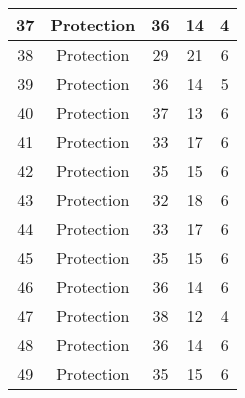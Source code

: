 \documentclass[results.tex]{subfiles}
\begin{document}
\begin{center}
\begin{tabular}{| c || c | c | c | c |}
            \hline
            37                      & Protection                   & 36                     & 14                      & 4                    \\
            \hline
            38                      & Protection                   & 29                     & 21                      & 6                    \\
            \hline
            39                      & Protection                   & 36                     & 14                      & 5                    \\
            \hline
            40                      & Protection                   & 37                     & 13                      & 6                    \\
            \hline
            41                      & Protection                   & 33                     & 17                      & 6                    \\
            \hline
            42                      & Protection                   & 35                     & 15                      & 6                    \\
            \hline
            43                      & Protection                   & 32                     & 18                      & 6                    \\
            \hline
            44                      & Protection                   & 33                     & 17                      & 6                    \\
            \hline
            45                      & Protection                   & 35                     & 15                      & 6                    \\
            \hline
            46                      & Protection                   & 36                     & 14                      & 6                    \\
            \hline
            47                      & Protection                   & 38                     & 12                      & 4                    \\
            \hline
            48                      & Protection                   & 36                     & 14                      & 6                    \\
            \hline
            49                      & Protection                   & 35                     & 15                      & 6                    \\
            \hline
        \end{tabular}
    \end{center}
\end{document}
